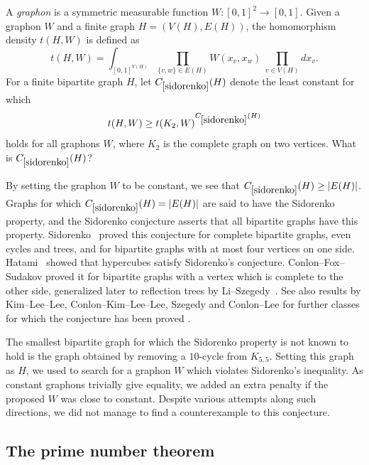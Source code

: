 \renewcommand{\problemURL}{https://google-deepmind.github.io/alphaevolve_repository_of_problems/problems/26.html}

\begin{problem}\label{sidorenko}
A \emph{graphon} is a symmetric measurable function $W \colon [0,1]^2 \to [0,1]$.  Given a graphon $W$ and a finite graph $H = (V(H),E(H))$, the homomorphism density $t(H,W)$ is defined as
$$ t(H,W) = \int_{[0,1]^{V(H)}} \prod_{\{v,w\} \in E(H)} W(x_v,x_w)\ \prod_{v \in V(H)} dx_v.$$
For a finite bipartite graph $H$, let $C_{\ref{sidorenko}}(H)$ denote the least constant for which
\[
t(H, W) \geq t(K_2, W)^{C_{\ref{sidorenko}}(H)}
\]
holds for all graphons $W$, where $K_2$ is the complete graph on two vertices.  What is $C_{\ref{sidorenko}}(H)$?
\end{problem}

By setting the graphon $W$ to be constant, we see that $C_{\ref{sidorenko}}(H) \geq |E(H)|$.  Graphs for which $C_{\ref{sidorenko}}(H) = |E(H)|$ are said to have the Sidorenko property, and the Sidorenko conjecture \cite{Sidorenko93} asserts that all bipartite graphs have this property.
Sidorenko~\cite{Sidorenko93} proved this conjecture for complete bipartite graphs, even cycles and trees, and for bipartite graphs with at most four vertices on one side. Hatami~\cite{Hatami2010} showed that hypercubes  satisfy Sidorenko's conjecture. Conlon--Fox--Sudakov \cite{Conlon2010} proved it for bipartite graphs with a vertex which is complete to the other side, generalized later to  reflection trees by Li--Szegedy~\cite{Li2011}. See also results by Kim--Lee--Lee, Conlon--Kim--Lee--Lee, Szegedy and Conlon--Lee for further classes for which the conjecture has been proved \cite{Conlon2018,ConlonUnpublished2018,Kim2016,Szegedy2014,ConlonLee2021}. 

The smallest bipartite graph for which the Sidorenko property is not known to hold is the graph obtained by removing a $10$-cycle from $K_{5,5}$. Setting this graph as $H$, we used \AlphaEvolve to search for a graphon $W$ which violates Sidorenko's inequality. As constant graphons trivially give equality, we added an extra penalty if the proposed $W$ was close to constant. Despite various attempts along such directions, we did not manage to find a counterexample to this conjecture.



\subsection{The prime number theorem}


